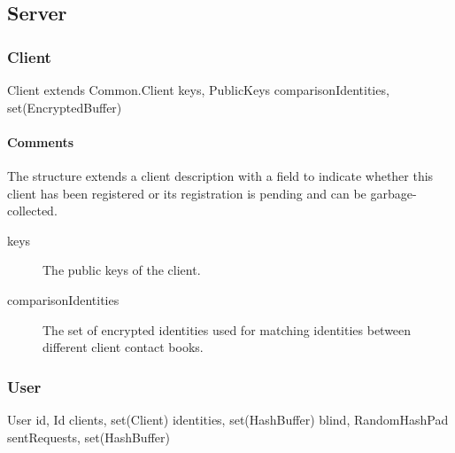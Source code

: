 \documentclass[a4paper,10pt]{article}
\begin{document}
\subsection{Server}
\label{sec:structure:server}

\subsubsection{Client}

\begin{verbbox}
Client extends Common.Client
{
  keys, PublicKeys
  comparisonIdentities, set(EncryptedBuffer)
}
\end{verbbox}
\begin{center}
\theverbbox
\end{center}

\begin{inparaitem}[ ]
 \item \infrastructure
\end{inparaitem}

\paragraph*{Comments}

The structure extends a client description with a field to indicate whether this client has been registered or its registration is pending and can be garbage-collected.

\SpecialItem
\begin{description}
 \item[keys] The public keys of the client.
 \item[comparisonIdentities] The set of encrypted identities used for matching identities between different client contact books.
\end{description}

\subsubsection{User}
\label{sec:structure:server:user}

\begin{verbbox}
User
{
  id, Id
  clients, set(Client)
  identities, set(HashBuffer)
  blind, RandomHashPad
  sentRequests, set(HashBuffer)
}
\end{verbbox}
\begin{center}
\theverbbox
\end{center}

\begin{inparaitem}[ ]
 \item \infrastructure
\end{inparaitem}
\end{document}
